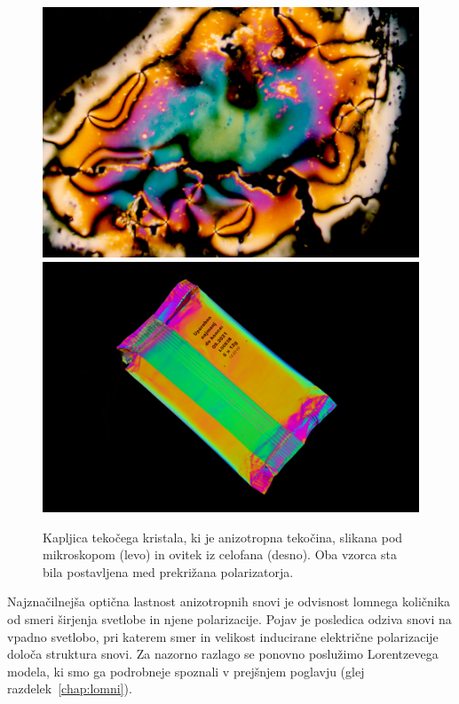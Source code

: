 \begin{figure}[ht]
\centering
\includegraphics[width=7truecm]{slike/10_foto_nematik.jpg}\hfill
\includegraphics[width=7truecm]{slike/10_foto_celofan.jpg}
\caption{Kapljica tekočega kristala, ki je anizotropna tekočina, slikana pod 
mikroskopom (levo) in ovitek iz celofana (desno). Oba vzorca sta bila postavljena
med prekrižana polarizatorja.}
\label{fig:10_nematik}
\end{figure}

Najznačilnejša optična lastnost anizotropnih snovi je odvisnost lomnega
količnika od smeri širjenja svetlobe in njene polarizacije. Pojav
je posledica odziva snovi na vpadno svetlobo, pri katerem smer in 
velikost inducirane električne polarizacije določa struktura snovi.  
Za nazorno razlago se ponovno poslužimo
Lorentzevega modela, ki smo ga podrobneje spoznali v prejšnjem 
poglavju (glej razdelek~\ref{chap:lomni}). 

